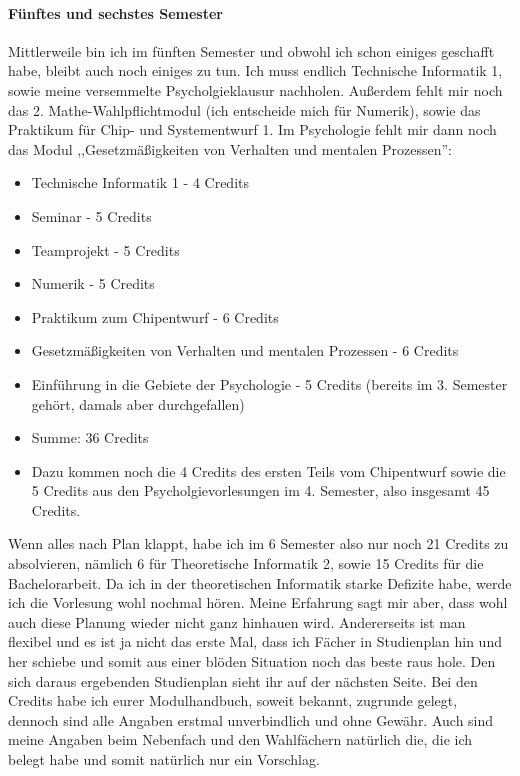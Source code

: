 \paragraph{Fünftes und sechstes Semester}
Mittlerweile bin ich im fünften Semester und obwohl ich
schon einiges geschafft habe, bleibt auch noch einiges zu tun. Ich
muss endlich Technische Informatik 1, sowie meine versemmelte Psycholgieklausur nachholen. Außerdem fehlt mir
noch das 2. Mathe-Wahlpflichtmodul (ich entscheide mich für Numerik), sowie  das Praktikum für Chip-
und Systementwurf 1. Im Psychologie fehlt mir dann noch das Modul ,,Gesetzmäßigkeiten von Verhalten und mentalen Prozessen'':
\begin{itemize}
\item Technische Informatik 1 - 4 Credits
\item Seminar - 5 Credits
\item Teamprojekt - 5 Credits
\item Numerik - 5 Credits
\item Praktikum zum Chipentwurf - 6 Credits
\item Gesetzmäßigkeiten von Verhalten und mentalen Prozessen - 6
  Credits
\item Einführung in die Gebiete der Psychologie - 5 Credits (bereits
  im 3. Semester gehört, damals aber durchgefallen)
\item Summe: 36 Credits
\item Dazu kommen noch die 4 Credits des ersten Teils vom Chipentwurf
 sowie die 5 Credits aus den Psycholgievorlesungen im 4. Semester,
 also insgesamt 45 Credits.
\end{itemize}
Wenn alles nach Plan klappt, habe ich im 6 Semester also nur noch 21
Credits zu absolvieren, nämlich 6 für Theoretische Informatik 2, sowie
15 Credits für die Bachelorarbeit. Da ich in der theoretischen
Informatik starke Defizite habe, werde ich die Vorlesung wohl nochmal
hören. Meine Erfahrung sagt mir aber, dass wohl auch diese Planung
wieder nicht ganz hinhauen wird. Andererseits ist man flexibel und es
ist ja nicht das erste Mal, dass ich Fächer in Studienplan hin und her
schiebe und somit aus einer blöden Situation noch das beste raus
hole. Den sich daraus ergebenden Studienplan sieht ihr auf der
nächsten Seite. 
Bei den Credits habe ich eurer Modulhandbuch, soweit bekannt,
zugrunde gelegt, dennoch sind alle Angaben erstmal unverbindlich und
ohne Gewähr. Auch sind meine Angaben beim Nebenfach und den
Wahlfächern natürlich die, die ich belegt habe und somit natürlich nur
ein Vorschlag.
